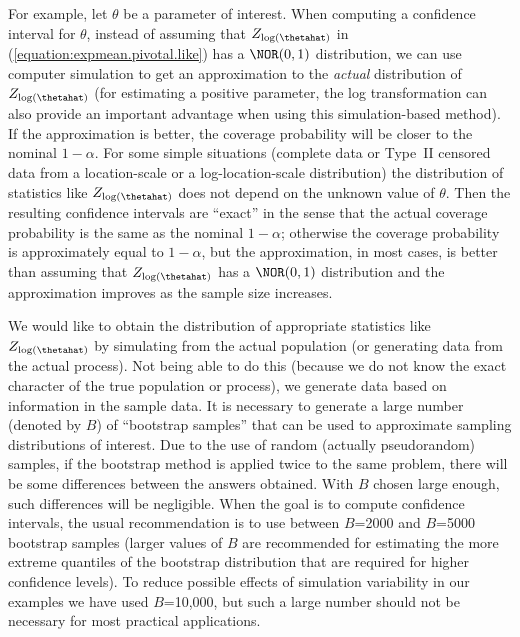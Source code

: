 For example, let $\theta$ be a parameter of interest.  When
computing a confidence interval for $\theta$, instead of assuming
that $Z_{\log(\thetahat)}$ in (\ref{equation:expmean.pivotal.like}) has
a $\NOR(0,1)$ distribution, we can use computer simulation to get an
approximation to the {\em actual} distribution of $Z_{\log(\thetahat)}$
(for estimating a positive parameter, the log transformation can
also provide an important advantage when using this simulation-based
method).  If the approximation is better, the coverage probability
will be closer to the nominal $1-\alpha$. For some simple
situations (complete data or Type~II censored data from a location-scale
or a log-location-scale distribution) the distribution of statistics
like $Z_{\log(\thetahat)}$ does not depend on the unknown value of
$\theta$. Then the resulting confidence intervals are ``exact'' in
the sense that the actual coverage probability is the same as the
nominal $1-\alpha$; otherwise the coverage probability is
approximately equal to $1-\alpha$, but the approximation, in most
cases, is better than assuming that $Z_{\log(\thetahat)}$ has a
$\NOR(0,1)$ distribution and the approximation improves as the
sample size increases.


We would like to obtain the distribution of appropriate statistics 
like $Z_{\log(\thetahat)}$ by
simulating from the actual population (or generating data from the
actual process). Not being able to do this (because we do not know the
exact character of the true population or process), we generate data
based on information in the sample data.  It is necessary to
generate a large number (denoted by $B$) of ``bootstrap samples'' that
can be used to approximate sampling distributions of interest.  Due to
the use of random (actually pseudorandom) samples, if the
bootstrap method is applied twice to the same problem, there will be
some differences between the answers obtained. With $B$ chosen large
enough, such differences will be negligible.  When the goal is to
compute confidence intervals, the usual recommendation is to use
between $B$=2000 and $B$=5000 bootstrap samples (larger values of
$B$ are recommended for estimating the more extreme quantiles of the
bootstrap distribution that are required for higher confidence
levels).  To reduce possible effects of simulation variability in our
examples we have used $B$=10,000, but such a large number should not
be necessary for most practical applications.

